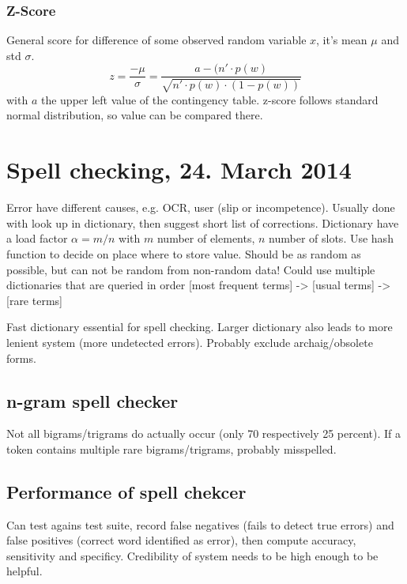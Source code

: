\documentclass[11pt]{article}
\begin{document}
\subsubsection{Z-Score}
General score for difference of some observed random variable $x$, it's mean $\mu$ and std $\sigma$.
\begin{equation}
	z = \frac{ - \mu}{\sigma} = \frac{a - (n' \cdot p(w)}{\sqrt{n' \cdot p(w) \cdot (1 - p(w))}}
\end{equation}
with $a$ the upper left value of the contingency table. z-score follows standard 
normal distribution, so value can be
compared there.

\section{Spell checking, 24. March 2014}
Error have different causes, e.g. OCR, user (slip or incompetence). Usually done with look up in dictionary, then suggest short list of corrections. Dictionary have a load
factor $\alpha = m/n$ with $m$ number of elements, $n$ number of slots. Use hash function to decide on 
place where to store value. Should be as random as possible, but can not be random from non-random data!
Could use multiple dictionaries that are queried in order [most frequent terms] -> [usual terms] -> [rare terms]

Fast dictionary essential for spell checking. Larger dictionary also leads to more lenient system (more
undetected errors). Probably exclude archaig/obsolete forms. 

\subsection{n-gram spell checker}
Not all bigrams/trigrams do actually occur (only 70 respectively 25 percent). If a token contains
multiple rare bigrams/trigrams, probably misspelled. 
\subsection{Performance of spell chekcer}
Can test agains test suite, record false negatives (fails to detect true errors) and false positives
(correct word identified as error), then compute accuracy, sensitivity and specificy. Credibility
of system needs to be high enough to be helpful.
\end{document}
